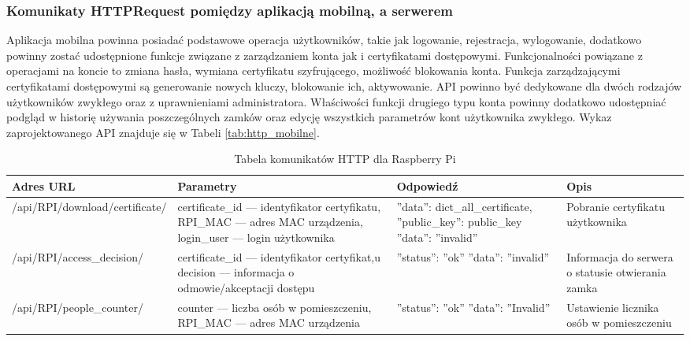 	\subsubsection{Komunikaty HTTPRequest pomiędzy aplikacją mobilną, \newline a serwerem}
	Aplikacja mobilna powinna posiadać podstawowe operacja użytkowników, takie jak logowanie, rejestracja, wylogowanie, dodatkowo powinny zostać udostępnione funkcje związane z zarządzaniem konta jak i certyfikatami dostępowymi. Funkcjonalności powiązane z operacjami na koncie to zmiana hasła, wymiana certyfikatu szyfrującego, możliwość blokowania konta. Funkcja zarządzającymi certyfikatami dostępowymi są generowanie nowych kluczy, blokowanie ich, aktywowanie. API powinno być dedykowane dla dwóch rodzajów użytkowników zwykłego oraz z uprawnieniami administratora. Właściwości funkcji drugiego typu konta powinny dodatkowo udostępniać podgląd w historię używania poszczególnych zamków oraz edycję wszystkich parametrów kont użytkownika zwykłego. Wykaz zaprojektowanego API znajduje się w Tabeli \ref{tab:http_mobilne}.\cite{programowanie_aplikacji_webowych}
	\begin{landscape}
		\begin{longtable}[!ht]{|m{5cm}|m{5cm}|m{4.5cm}|m{4cm}|} 
			\caption{Tabela komunikatów HTTP dla Raspberry Pi}
			\label{tab:http_raspberry}\\
			\hline	
			Adres URL & Parametry & Odpowiedź & Opis \\	\hline
			/api/RPI/download/certificate/ & certificate\_id --- identyfikator certyfikatu, \newline RPI\_MAC --- adres MAC \linebreak urządzenia, \newline login\_user --- login użytkownika & ''data'': dict\_all\_certificate, \newline ''public\_key'': public\_key \tablinia ''data'': ''invalid'' & Pobranie certyfikatu użytkownika \\ \hline
			/api/RPI/access\_decision/ & certificate\_id --- identyfikator certyfikat,u \newline decision --- informacja o odmowie/akceptacji dostępu & ''status'': ''ok'' \tablinia ''data'': ''invalid'' & Informacja do serwera o statusie otwierania zamka \\ \hline
			/api/RPI/people\_counter/ & counter --- liczba osób w pomieszczeniu, \newline RPI\_MAC --- adres MAC urządzenia & ''status'': ''ok'' \tablinia ''data'': ''Invalid'' & Ustawienie licznika osób w pomieszczeniu \\ \hline
		\end{longtable}
	\end{landscape}

